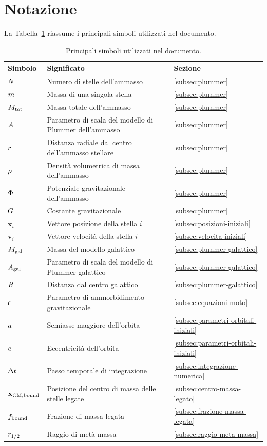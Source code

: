 \section{Notazione}
\label{sec:notazione}
La Tabella~\ref{tab:notazione} riassume i principali simboli utilizzati nel documento.
\begin{table}[H]
	\centering
	\small
	\caption{Principali simboli utilizzati nel documento.}
	\label{tab:notazione}
	\begin{tabular}{p{}p{}p{}}
		\hline
		\textbf{Simbolo} & \textbf{Significato} & \textbf{Sezione} \\
		\hline
		$N$ & Numero di stelle dell'ammasso & \ref{subsec:plummer} \\
		$m$ & Massa di una singola stella & \ref{subsec:plummer} \\
		$M_{\mathrm{tot}}$ & Massa totale dell'ammasso & \ref{subsec:plummer} \\
		$A$ & Parametro di scala del modello di Plummer dell'ammasso & \ref{subsec:plummer} \\
		$r$ & Distanza radiale dal centro dell'ammasso stellare & \ref{subsec:plummer} \\
		$\rho$ & Densità volumetrica di massa dell'ammasso & \ref{subsec:plummer} \\
		$\Phi$ & Potenziale gravitazionale dell'ammasso & \ref{subsec:plummer} \\
		$G$ & Costante gravitazionale & \ref{subsec:plummer} \\
		$\mathbf{x}_i$ & Vettore posizione della stella $i$ & \ref{subsec:posizioni-iniziali} \\
		$\mathbf{v}_i$ & Vettore velocità della stella $i$ & \ref{subsec:velocita-iniziali} \\
		$M_{\mathrm{gal}}$ & Massa del modello galattico & \ref{subsec:plummer-galattico} \\
		$A_{\mathrm{gal}}$ & Parametro di scala del modello di Plummer galattico & \ref{subsec:plummer-galattico} \\
		$R$ & Distanza dal centro galattico & \ref{subsec:plummer-galattico} \\
		$\epsilon$ & Parametro di ammorbidimento gravitazionale & \ref{subsec:equazioni-moto} \\
		$a$ & Semiasse maggiore dell'orbita & \ref{subsec:parametri-orbitali-iniziali} \\
		$e$ & Eccentricità dell'orbita & \ref{subsec:parametri-orbitali-iniziali} \\
		$\Delta t$ & Passo temporale di integrazione & \ref{subsec:integrazione-numerica} \\
		$\mathbf{x}_{\mathrm{CM,bound}}$ & Posizione del centro di massa delle stelle legate & \ref{subsec:centro-massa-legato} \\
		$f_{\mathrm{bound}}$ & Frazione di massa legata & \ref{subsec:frazione-massa-legata} \\
		$r_{1/2}$ & Raggio di metà massa & \ref{subsec:raggio-meta-massa} \\
		\hline
	\end{tabular}
\end{table}
